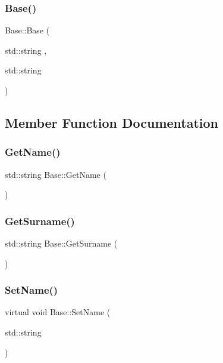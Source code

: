 \mbox{\label{class_base_addfb2253ad55343f6c063ea27ee961b5}} 
\subsubsection{\texorpdfstring{Base()}{Base()}\hspace{0.1cm}{\footnotesize\ttfamily [2/2]}}
{\footnotesize\ttfamily Base\+::\+Base (\begin{DoxyParamCaption}\item[{std\+::string}]{,  }\item[{std\+::string}]{ }\end{DoxyParamCaption})}



\subsection{Member Function Documentation}
\mbox{\label{class_base_a8c1af41b4f340feded321cd6c065058e}} 
\subsubsection{\texorpdfstring{GetName()}{GetName()}}
{\footnotesize\ttfamily std\+::string Base\+::\+Get\+Name (\begin{DoxyParamCaption}{ }\end{DoxyParamCaption})}

\mbox{\label{class_base_a96434ed4761c3394033df340df6ad066}} 
\subsubsection{\texorpdfstring{GetSurname()}{GetSurname()}}
{\footnotesize\ttfamily std\+::string Base\+::\+Get\+Surname (\begin{DoxyParamCaption}{ }\end{DoxyParamCaption})}

\mbox{\label{class_base_a36e77d06849030aa9610fedeef0cbf90}} 
\subsubsection{\texorpdfstring{SetName()}{SetName()}}
{\footnotesize\ttfamily virtual void Base\+::\+Set\+Name (\begin{DoxyParamCaption}\item[{std\+::string}]{ }\end{DoxyParamCaption})\hspace{0.3cm}{\ttfamily [pure virtual]}}



